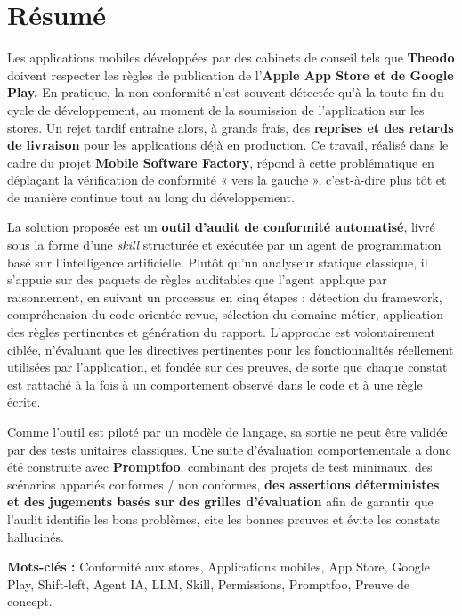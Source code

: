 \chapter*{Résumé}

\vspace{0.5cm}

Les applications mobiles développées par des cabinets de conseil tels que \textbf{Theodo} doivent respecter les règles de publication de l'\textbf{Apple App Store et de Google Play.} En pratique, la non-conformité n'est souvent détectée qu'à la toute fin du cycle de développement, au moment de la soumission de l'application sur les stores. Un rejet tardif entraîne alors, à grands frais, des \textbf{reprises et des retards de livraison} pour les applications déjà en production. Ce travail, réalisé dans le cadre du projet \textbf{Mobile Software Factory}, répond à cette problématique en déplaçant la vérification de conformité « vers la gauche », c'est-à-dire plus tôt et de manière continue tout au long du développement.

\vspace{0.3cm}

La solution proposée est un \textbf{outil d'audit de conformité automatisé}, livré sous la forme d'une \textit{skill} structurée et exécutée par un agent de programmation basé sur l'intelligence artificielle. Plutôt qu'un analyseur statique classique, il s'appuie sur des paquets de règles auditables que l'agent applique par raisonnement, en suivant un processus en cinq étapes : détection du framework, compréhension du code orientée revue, sélection du domaine métier, application des règles pertinentes et génération du rapport. L'approche est volontairement ciblée, n'évaluant que les directives pertinentes pour les fonctionnalités réellement utilisées par l'application, et fondée sur des preuves, de sorte que chaque constat est rattaché à la fois à un comportement observé dans le code et à une règle écrite.

\vspace{0.3cm}

Comme l'outil est piloté par un modèle de langage, sa sortie ne peut être validée par des tests unitaires classiques. Une suite d'évaluation comportementale a donc été construite avec \textbf{Promptfoo}, combinant des projets de test minimaux, des scénarios appariés conformes / non conformes, \textbf{des assertions déterministes et des jugements basés sur des grilles d'évaluation} afin de garantir que l'audit identifie les bons problèmes, cite les bonnes preuves et évite les constats hallucinés.

\vspace{0.8cm}

\noindent\textbf{Mots-clés :} Conformité aux stores, Applications mobiles, App Store, Google Play, Shift-left, Agent IA, LLM, Skill, Permissions, Promptfoo, Preuve de concept.

\clearpage
